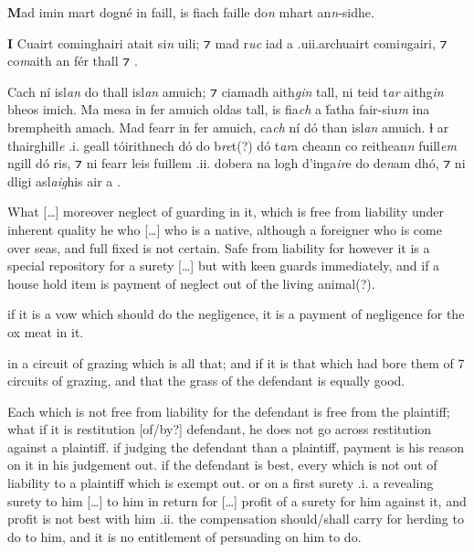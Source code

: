 \documentclass[11pt]{article}
\begin{document}
\begin{pages}
\begin{Leftside}
    \pstart
    \textbf{M}ad imin mart dogn\'{e} in faill, is fiach faille do\emph{n} mhart an\emph{n}-sidhe.
    \pend
    
    \pstart
    \textbf{I} Cuairt cominghairi atait si\emph{n} uili; ⁊ mad r\emph{uc} iad a .uii.archuairt comi\emph{n}gairi, ⁊ co\emph{m}aith an f\'{e}r thall ⁊ .
    \pend

    \pstart
    Cach n\'{i} isl\emph{an} do thall isl\emph{an} amuich; ⁊ ciamadh aith\emph{gin} tall, ni teid t\emph{ar} aithg\emph{in} bheos imich.  Ma mesa in fer amuich oldas tall, is fia\emph{ch} a \.{f}atha fair-siu\emph{m} ina bremph{eith} amach.  Mad fearr in fer amuich, ca\emph{ch} n\'{i}  d\'{o} than isl\emph{an} amuich. ɫ ar thairghill\emph{e} .i. geall t\'{o}irithnech d\'{o} do b\emph{re}t(?) d\'{o} t\emph{ar}a cheann co reithean\emph{n} fuill\emph{em} ngill d\'{o} ris, ⁊ ni fearr leis fuillem .ii. dobera na logh d'inga\emph{ir}e do de\emph{n}am dh\'{o}, ⁊ ni dligi asl\emph{aig}his air a .
    \pend
    \endnumbering
  \end{Leftside}

  \begin{Rightside}
    \beginnumbering
   \pstart
   What [\ldots] moreover neglect of guarding in it, which is free from liability under inherent quality he who [\ldots] who is a native, although a foreigner who is come over seas, and full fixed is not certain.  Safe from liability for however it is a special repository for a surety [\ldots] but with keen guards immediately, and if a house hold item is payment of neglect out of the living animal(?). 
     \pend

     \pstart
     if it is a vow which should do the negligence, it is a payment of negligence for the ox meat in it.
     \pend

     \pstart
      in a circuit of grazing which is all that; and if it is that which had bore them of 7 circuits of grazing, and that the grass of the defendant is equally good.
     \pend

     \pstart
      Each which is not free from liability for the defendant is free from the plaintiff; what if it is restitution [of/by?] defendant, he does not go across restitution against a plaintiff. if judging the defendant than a plaintiff, payment is his reason on it in his judgement out. if the defendant is best, every which is not out of liability to a plaintiff which is exempt out. or on a first surety .i. a revealing surety to him [\ldots] to him in return for  [\ldots] profit of a surety for him against it, and profit is not best with him .ii. the compensation should/shall carry for herding to do to him, and it is no entitlement of persuading on him to do. 
     \pend
    \endnumbering
  \end{Rightside}
  \Pages


\end{pages}
\end{document}
